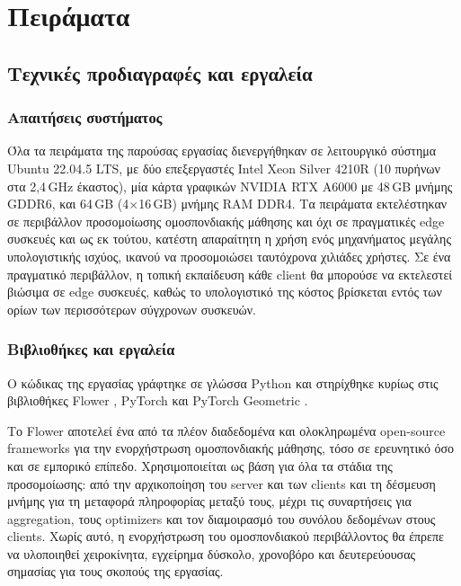 \chapter{Πειράματα}\label{ch:experiments}

\section{Τεχνικές προδιαγραφές και εργαλεία}\label{sec:exp-setup}
\subsection{Απαιτήσεις συστήματος}\label{ssec:exp-hardware}
Όλα τα πειράματα της παρούσας εργασίας διενεργήθηκαν σε λειτουργικό σύστημα Ubuntu 22.04.5 LTS, με δύο επεξεργαστές Intel Xeon Silver 4210R (10 πυρήνων στα 2,4\,GHz έκαστος), μία κάρτα γραφικών NVIDIA RTX A6000 με 48\,GB μνήμης GDDR6, και 64\,GB (4$\times$16\,GB) μνήμης RAM DDR4. Τα πειράματα εκτελέστηκαν σε περιβάλλον προσομοίωσης ομοσπονδιακής μάθησης και όχι σε πραγματικές edge συσκευές και ως εκ τούτου, κατέστη απαραίτητη η χρήση ενός μηχανήματος μεγάλης υπολογιστικής ισχύος, ικανού να προσομοιώσει ταυτόχρονα χιλιάδες χρήστες. Σε ένα πραγματικό περιβάλλον, η τοπική εκπαίδευση κάθε client θα μπορούσε να εκτελεστεί βιώσιμα σε edge συσκευές, καθώς το υπολογιστικό της κόστος βρίσκεται εντός των ορίων των περισσότερων σύγχρονων συσκευών.

\subsection{Βιβλιοθήκες και εργαλεία}\label{sec:exp-tools}
Ο κώδικας της εργασίας γράφτηκε σε γλώσσα Python και στηρίχθηκε κυρίως στις βιβλιοθήκες Flower \cite{beutel_flower_2020, flower_software}, PyTorch \cite{paszke_pytorch_2019, pytorch_software} και PyTorch Geometric \cite{fey_fast_2019, pyg_software}.

Το Flower αποτελεί ένα από τα πλέον διαδεδομένα και ολοκληρωμένα open-source frameworks για την ενορχήστρωση ομοσπονδιακής μάθησης, τόσο σε ερευνητικό όσο και σε εμπορικό επίπεδο. Χρησιμοποιείται ως βάση για όλα τα στάδια της προσομοίωσης: από την αρχικοποίηση του server και των clients και τη δέσμευση μνήμης για τη μεταφορά πληροφορίας μεταξύ τους, μέχρι τις συναρτήσεις για aggregation, τους optimizers και τον διαμοιρασμό του συνόλου δεδομένων στους clients. Χωρίς αυτό, η ενορχήστρωση του ομοσπονδιακού περιβάλλοντος θα έπρεπε να υλοποιηθεί χειροκίνητα, εγχείρημα δύσκολο, χρονοβόρο και δευτερεύουσας σημασίας για τους σκοπούς της εργασίας.

